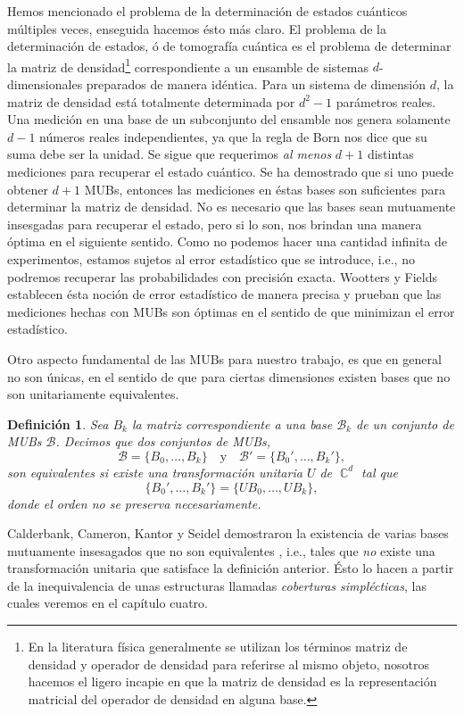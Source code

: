 \documentclass[a4paper]{report}
\DeclareMathOperator{\C}{\mathbb{C}}
\newtheorem{definition}{Definición}
\begin{document}
  Hemos mencionado el problema de la determinación de
  estados cuánticos múltiples veces, enseguida hacemos ésto
  más claro. El problema de la determinación de estados, ó
  de tomografía cuántica es el problema de determinar la
  matriz de densidad\footnote{En la literatura física
    generalmente se utilizan los términos matriz de densidad
    y operador de densidad para referirse al mismo objeto,
    nosotros hacemos el ligero incapie en que la matriz de
    densidad es la representación matricial del operador de
  densidad en alguna base.} correspondiente a un ensamble
  de sistemas $d$-dimensionales preparados de manera
  idéntica. Para un sistema de dimensión $d$, la matriz de
  densidad está totalmente determinada por $d^2-1$
  parámetros reales. Una medición en una base de un
  subconjunto del ensamble nos genera solamente $d-1$
  números reales independientes, ya que la regla de Born
  nos dice que su suma debe ser la unidad. Se sigue que
  requerimos \textit{al menos} $d+1$ distintas mediciones
  para recuperar el estado cuántico. Se ha demostrado que si
  uno puede obtener $d+1$ MUBs, entonces las mediciones en
  éstas bases son suficientes para determinar la matriz de
  densidad. No es necesario que las bases sean mutuamente
  insesgadas para recuperar el estado, pero si lo son, nos
  brindan una manera óptima en el siguiente sentido. Como no
  podemos hacer una cantidad infinita de experimentos,
  estamos sujetos al error estadístico que se introduce,
  i.e., no podremos recuperar las probabilidades con
  precisión exacta. Wootters y Fields  establecen ésta
  noción de error estadístico de manera precisa y prueban
  que las mediciones hechas con MUBs son óptimas en el
  sentido de que minimizan el error estadístico. 

  Otro aspecto fundamental de las MUBs para nuestro trabajo,
  es que en general no son únicas, en el sentido de que para
  ciertas dimensiones existen bases que no son unitariamente
  equivalentes.
  \begin{definition}
    Sea $B_k$ la matriz correspondiente a una base $\mathcal
    B_k$ de un conjunto de MUBs $\mathcal B$. Decimos que
    dos conjuntos de MUBs, 
    \[
      \mathcal B = \{B_0,\ldots,B_k\}
      \quad \text{y} \quad
      \mathcal B' = \{B_0',\ldots, B_k'\},
    \]
    son equivalentes si existe una transformación unitaria
    $U$ de $\C^{d}$ tal que
    \begin{equation}
      \{B_0',\ldots,B_k'\}
      = \{UB_0, \ldots,UB_k\},
    \end{equation}
    donde el orden no se preserva necesariamente.
  \end{definition}
  Calderbank, Cameron, Kantor y Seidel demostraron la
  existencia de varias bases mutuamente insesagados que no
  son equivalentes \cite{kantor2012}, i.e., tales que
  \textit{no} existe una transformación unitaria que
  satisface la definición anterior. Ésto lo hacen a partir
  de la inequivalencia de unas estructuras llamadas
  \textit{coberturas simplécticas}, las cuales veremos en el
  capítulo cuatro.
\end{document}
